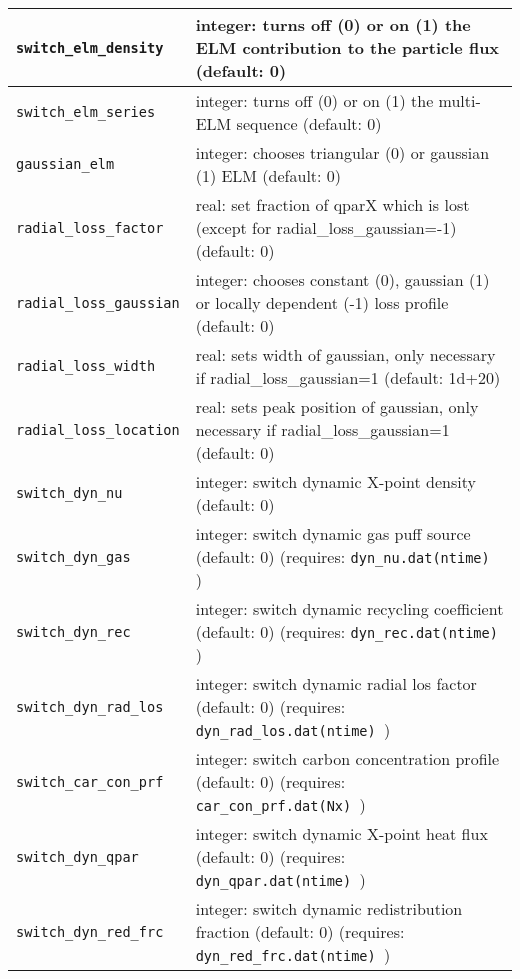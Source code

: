 \documentclass[amsmath,amssymb,a4]{revtex4-2}
\begin{document}
\begin{table}[h]
\begin{center}
\begin{tabular}{|| l  | l ||}
    {\tt switch\_elm\_density}   & integer: turns off (0) or on (1) the ELM contribution to the particle flux (default: 0) \\ \hline
    {\tt switch\_elm\_series}    & integer: turns off (0) or on (1) the multi-ELM sequence (default: 0) \\ \hline
    {\tt gaussian\_elm}      & integer: chooses triangular (0) or gaussian (1) ELM (default: 0) \\ \hline
    {\tt radial\_loss\_factor} & real: set fraction of qparX which is lost (except for radial\_loss\_gaussian=-1) (default: 0) \\ \hline
    {\tt radial\_loss\_gaussian} & integer: chooses constant (0), gaussian (1) or locally dependent (-1) loss profile (default: 0) \\ \hline
    {\tt radial\_loss\_width}  & real: sets width of gaussian, only necessary if radial\_loss\_gaussian=1 (default: 1d+20) \\ \hline
    {\tt radial\_loss\_location} & real: sets peak position of gaussian, only necessary if radial\_loss\_gaussian=1 (default: 0) \\ \hline
    {\tt switch\_dyn\_nu} & integer: switch dynamic X-point density (default: 0)   \\ \hline
    {\tt switch\_dyn\_gas} & integer: switch dynamic gas puff source  (default: 0) (requires: {\tt dyn\_nu.dat(ntime) }) \\ \hline
    {\tt switch\_dyn\_rec} & integer: switch dynamic recycling coefficient (default: 0) (requires: {\tt dyn\_rec.dat(ntime) })   \\ \hline
    {\tt switch\_dyn\_rad\_los} & integer:  switch dynamic radial los factor (default: 0) (requires: {\tt dyn\_rad\_los.dat(ntime) })  \\ \hline
    {\tt switch\_car\_con\_prf} & integer: switch carbon concentration profile (default: 0) (requires: {\tt car\_con\_prf.dat(Nx) }) \\ \hline
    {\tt switch\_dyn\_qpar} & integer: switch dynamic X-point heat flux (default: 0) (requires: {\tt dyn\_qpar.dat(ntime) })  \\ \hline
    {\tt switch\_dyn\_red\_frc} & integer: switch dynamic redistribution fraction (default: 0)  (requires: {\tt dyn\_red\_frc.dat(ntime) })  \\ \hline
    \hline
  \end{tabular}
\end{center}
\end{table}
\end{document}
